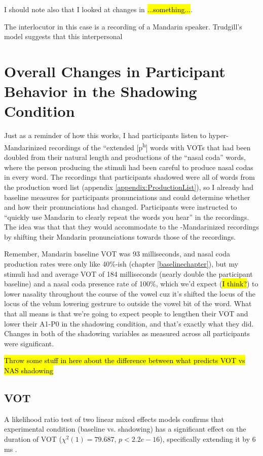 I should note also that I looked at changes in \hl{...something...}.

The interlocutor in this case is a recording of a Mandarin speaker. Trudgill's model suggests that this interpersonal 

    \section{Overall Changes in Participant Behavior in the Shadowing Condition} %
    \label{sec:doTheyShadow}
    Just as a reminder of how this works, I had participants listen to hyper-Mandarinized recordings of the ``extended [p\textsuperscript{h}] words with VOTs that had been doubled from their natural length and productions of the ``nasal coda'' words, where the person producing the stimuli had been careful to produce nasal codas in every word. The recordings that participants shadowed were all of words from the production word list (appendix \ref{appendix:ProductionList}), so I already had baseline measures for participants pronunciations and could determine whether and how their pronunciations had changed. Participants were instructed to ``quickly use Mandarin to clearly repeat the words you hear'' in the recordings. The idea was that that they would accommodate to the -Mandarinized recordings by shifting their Mandarin pronunciations towards those of the recordings.
    
    Remember, Mandarin baseline VOT was 93 milliseconds, and nasal coda production rates were only like 40\%-ish (chapter \ref{baselinechapter}), but my stimuli had and average VOT of 184 milliseconds (nearly double the participant baseline) and a nasal coda presence rate of 100\%, which we'd expect (\hl{I think?}) to lower nasality throughout the course of the vowel cuz it's shifted the locus of the locus of the velum lowering gestrure to outside the vowel bit of the word. What that all means is that we're going to expect people to lengthen their VOT and lower their A1-P0 in the shadowing condition, and that's exactly what they did. Changes in both of the shadowing variables as measured across all participants were significant.
    
    \hl{Throw some stuff in here about the difference between what predicts VOT vs NAS shadowing}

        \subsection{VOT}
         A likelihood ratio test of two linear mixed effects models confirms that experimental condition (baseline vs. shadowing) has a significant effect on the duration of VOT ($\chi^2 (1) = 79.687$, $ p < 2.2e-16$), specifically extending it by 6 ms .

